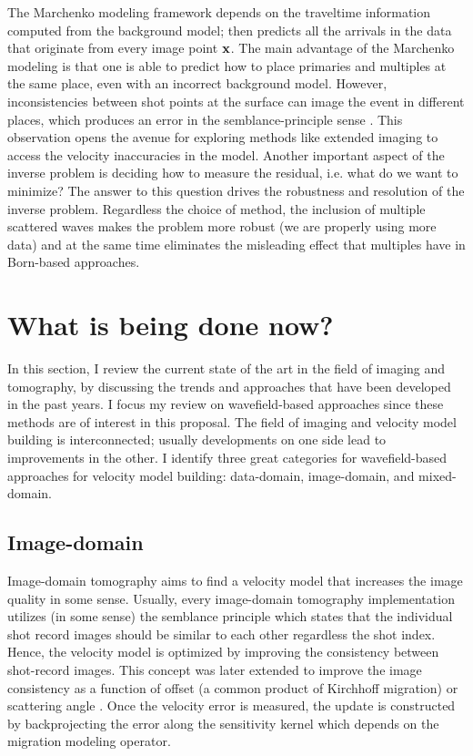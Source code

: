 The Marchenko modeling framework depends on the traveltime information computed from the background model;
then predicts all the arrivals in the data that originate from every image point ${\bf x}$. 
The main advantage of the Marchenko modeling is that one is able to predict how 
to place primaries and multiples at the same place, even with an incorrect background model. 
 However, inconsistencies between shot points at the surface can 
image the event in different places, which produces an error in the semblance-principle sense \citep{Alyahya1989VAiterativeProfileMig}.
 This observation opens the avenue for exploring methods like extended imaging to access the velocity 
inaccuracies in the model.
  Another important aspect of the inverse problem is deciding how to measure the residual, i.e. what do we want to minimize? 
 The answer to this question drives the robustness and resolution of the inverse problem. 
Regardless the choice of method, the inclusion
of multiple scattered waves makes the problem more robust (we are properly using more data) and at the 
same time eliminates the misleading effect that multiples have in Born-based approaches. 



\section{What is being done now?}
In this section, I review the current state of the art in the field of imaging and tomography, 
by discussing the trends and approaches that have been developed in the past years. I focus my 
review on wavefield-based approaches since these methods are of interest in this proposal. The field of 
imaging and velocity model building is interconnected; usually developments on one side lead to 
improvements in the other.
I identify three great categories for wavefield-based approaches
 for velocity model building: data-domain, image-domain, and mixed-domain. 




\subsection{Image-domain}
 Image-domain tomography aims to find a velocity model that increases the image quality
in some sense. Usually, every image-domain tomography implementation utilizes (in some sense)
the semblance principle \citep{Alyahya1989VAiterativeProfileMig} which  
 states that the individual shot record images should be similar to each other regardless the shot index. 
Hence, the velocity model is optimized by improving the consistency between shot-record 
images. This concept was later extended to improve the image consistency as a function
of offset (a common product of Kirchhoff migration) or scattering angle 
\citep{stork,Chavent1995MultipleMigrationFitting,Ji}. 
 Once the velocity error is measured, the update is constructed by backprojecting 
the error along the sensitivity kernel which depends on the migration modeling operator. 

